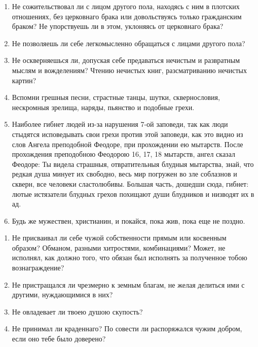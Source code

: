 \begin{mymulticols}

\begin{enumerate}

\item Не сожительствовал ли с лицом другого пола, находясь с ним в плотских отношениях, без церковнаго брака или довольствуясь только гражданским браком? Не упорствуешь ли в этом, уклоняясь от церковнаго брака?

\item Не позволяешь ли себе легкомысленно обращаться с лицами другого пола?

\item Не оскверняешься ли, допуская себе предаваться нечистым и развратным мыслям и вожделениям? Чтению нечистых книг, разсматриванию нечистых картин?

\item Вспомни грешныя песни, страстные танцы, шутки, сквернословия, нескромныя зрелища, наряды, пьянство и подобные грехи.

\item Наиболее гибнет людей из-за нарушения 7-ой заповеди, так как люди стыдятся исповедывать свои грехи против этой заповеди, как это видно из слов Ангела преподобной Феодоре, при прохождении ею мытарств. После прохождения преподобною Феодорою 16, 17, 18 мытарств, ангел сказал Феодоре: Ты видела страшныя, отвратительныя блудныя мытарства, знай, что редкая душа минует их свободно, весь мир погружен во зле соблазнов и скверн, все человеки сластолюбивы. Большая часть, дошедши сюда, гибнет: лютые истязатели блудных грехов похищают души блудников и низводят их в ад.

\item Будь же мужествен, христианин, и покайся, пока жив, пока еще не поздно. 
\end{enumerate}

\end{mymulticols}

\nopagebreak

\begin{mymulticols}

\begin{enumerate}

\item Не присваивал ли себе чужой собственности прямым или косвенным образом? Обманом, разными хитростями, комбинациями? Может, не исполнял, как должно того, что обязан был исполнять за полученное тобою вознаграждение?

\item Не пристращался ли чрезмерно к земным благам, не желая делиться ими с другими, нуждающимися в них?

\item Не овладевает ли твоею душою скупость?

\item Не принимал ли краденнаго? По совести ли распоряжался чужим добром, если оно тебе было доверено? 

\end{enumerate}

\end{mymulticols}

